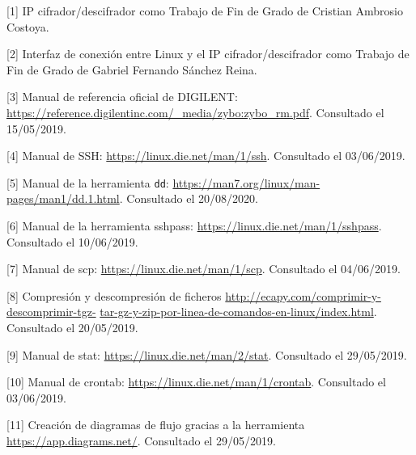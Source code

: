 \hspace{0.5cm}	[\hypertarget{1}{1}] IP cifrador/descifrador como Trabajo de Fin de Grado de Cristian Ambrosio Costoya. %

\hspace{0.5cm}	[\hypertarget{2}{2}] Interfaz de conexión entre Linux y el IP cifrador/descifrador como Trabajo de Fin de Grado de Gabriel Fernando Sánchez Reina. %

\hspace{0.5cm}	[\hypertarget{3}{3}] Manual de referencia oficial de DIGILENT: \url{https://reference.digilentinc.com/_media/zybo:zybo_rm.pdf}. Consultado el 15/05/2019.

\hspace{0.5cm}	[\hypertarget{4}{4}] Manual de SSH: \url{https://linux.die.net/man/1/ssh}. Consultado el 03/06/2019.

\hspace{0.5cm}	[\hypertarget{5}{5}] Manual de la herramienta \texttt{dd}: \url{https://man7.org/linux/man-pages/man1/dd.1.html}. Consultado el 20/08/2020.

\hspace{0.5cm}	[\hypertarget{6}{6}] Manual de la herramienta sshpass: \url{https://linux.die.net/man/1/sshpass}. Consultado el 10/06/2019.

\hspace{0.5cm}	[\hypertarget{7}{7}] Manual de scp: \url{https://linux.die.net/man/1/scp}. Consultado el 04/06/2019.

\hspace{0.5cm}	[\hypertarget{8}{8}] Compresión y descompresión de ficheros \url{http://ecapy.com/comprimir-y-descomprimir-tgz-} \url{tar-gz-y-zip-por-linea-de-comandos-en-linux/index.html}. Consultado el 20/05/2019.

\hspace{0.5cm}	[\hypertarget{9}{9}] Manual de stat: \url{https://linux.die.net/man/2/stat}. Consultado el 29/05/2019.

\hspace{0.5cm}	[\hypertarget{10}{10}] Manual de crontab: \url{https://linux.die.net/man/1/crontab}. Consultado el 03/06/2019.
	
\hspace{0.5cm}	[\hypertarget{11}{11}] Creación de diagramas de flujo gracias a la herramienta \url{https://app.diagrams.net/}. Consultado el 29/05/2019.
	
